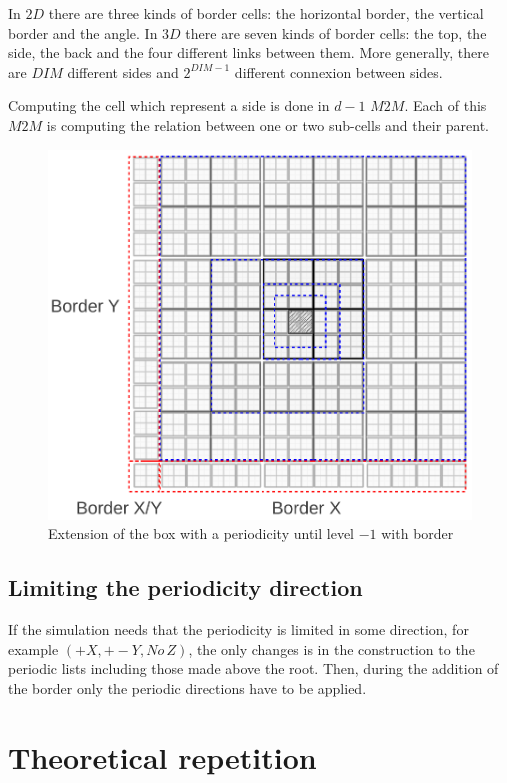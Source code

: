 \documentclass[12pt]{article} %
\begin{document}
In $2D$ there are three kinds of border cells: the horizontal border, the vertical border and the angle.
In $3D$ there are seven kinds of border cells: the top, the side, the back and the four different links between them.
More generally, there are $DIM$ different sides and $2^{DIM-1}$ different connexion between sides.

Computing the cell which represent a side is done in $d-1$ $M2M$.
Each of this $M2M$ is computing the relation between one or two sub-cells and their parent.

\begin{figure}[h]
\centering
\includegraphics[scale=0.45]{../Images/Border}
\caption{Extension of the box with a periodicity until level $-1$ with border}
\end{figure}

\subsection{Limiting the periodicity direction}

If the simulation needs that the periodicity is limited in some direction, for example $(+X,+-Y,No \, Z)$, the only changes is in the construction to the periodic lists including those made above the root.
Then, during the addition of the border only the periodic directions have to be applied.

\section{Theoretical repetition}
\end{document}
